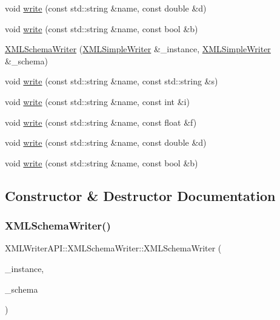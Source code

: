 \begin{DoxyCompactItemize}
void \mbox{\hyperlink{classXMLWriterAPI_1_1XMLSchemaWriter_aaa0138613c826e77a63e5195bc742f07}{write}} (const std\+::string \&name, const double \&d)
\item 
void \mbox{\hyperlink{classXMLWriterAPI_1_1XMLSchemaWriter_a0d6bf66ccbb217c4db704568f9c377fe}{write}} (const std\+::string \&name, const bool \&b)
\item 
\mbox{\hyperlink{classXMLWriterAPI_1_1XMLSchemaWriter_a2284f6d1214940974d547c380e1ecfc8}{X\+M\+L\+Schema\+Writer}} (\mbox{\hyperlink{classXMLWriterAPI_1_1XMLSimpleWriter}{X\+M\+L\+Simple\+Writer}} \&\+\_\+instance, \mbox{\hyperlink{classXMLWriterAPI_1_1XMLSimpleWriter}{X\+M\+L\+Simple\+Writer}} \&\+\_\+schema)
\item 
void \mbox{\hyperlink{classXMLWriterAPI_1_1XMLSchemaWriter_a1922edfcbb9d52c70949fd8c8dd97569}{write}} (const std\+::string \&name, const std\+::string \&s)
\item 
void \mbox{\hyperlink{classXMLWriterAPI_1_1XMLSchemaWriter_a1b951af62e2106b76e33022c0f1b5d88}{write}} (const std\+::string \&name, const int \&i)
\item 
void \mbox{\hyperlink{classXMLWriterAPI_1_1XMLSchemaWriter_affbcfbac63240a8048b6b0940cc05c30}{write}} (const std\+::string \&name, const float \&f)
\item 
void \mbox{\hyperlink{classXMLWriterAPI_1_1XMLSchemaWriter_aaa0138613c826e77a63e5195bc742f07}{write}} (const std\+::string \&name, const double \&d)
\item 
void \mbox{\hyperlink{classXMLWriterAPI_1_1XMLSchemaWriter_a0d6bf66ccbb217c4db704568f9c377fe}{write}} (const std\+::string \&name, const bool \&b)
\end{DoxyCompactItemize}


\subsection{Constructor \& Destructor Documentation}
\mbox{\label{classXMLWriterAPI_1_1XMLSchemaWriter_a2284f6d1214940974d547c380e1ecfc8}} 
\subsubsection{\texorpdfstring{XMLSchemaWriter()}{XMLSchemaWriter()}\hspace{0.1cm}{\footnotesize\ttfamily [1/3]}}
{\footnotesize\ttfamily X\+M\+L\+Writer\+A\+P\+I\+::\+X\+M\+L\+Schema\+Writer\+::\+X\+M\+L\+Schema\+Writer (\begin{DoxyParamCaption}\item[{\mbox{\hyperlink{classXMLWriterAPI_1_1XMLSimpleWriter}{X\+M\+L\+Simple\+Writer}} \&}]{\+\_\+instance,  }\item[{\mbox{\hyperlink{classXMLWriterAPI_1_1XMLSimpleWriter}{X\+M\+L\+Simple\+Writer}} \&}]{\+\_\+schema }\end{DoxyParamCaption})\hspace{0.3cm}{\ttfamily [inline]}}


